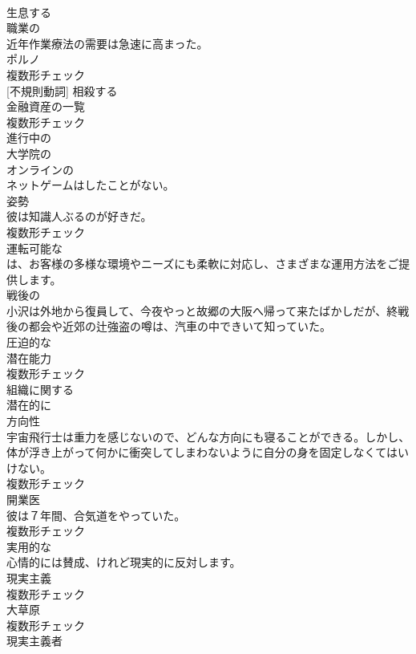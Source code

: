 \documentclass[8pt]{extreport}
\begin{document}
\begin{CJK}{UTF8}{min}
\\	[動詞]	生息する	
\\	[形容詞]	職業の	
\\	近年作業療法の需要は急速に高まった。	
\\	[名詞]	ポルノ	
\\	複数形チェック
\\	[動詞] [不規則動詞]	相殺する	
\\	[名詞]	金融資産の一覧	
\\	複数形チェック
\\	[形容詞]	進行中の	
\\	[形容詞]	大学院の	
\\	[形容詞]	オンラインの	
\\	ネットゲームはしたことがない。	
\\	[名詞]	姿勢	
\\	彼は知識人ぶるのが好きだ。	
\\	複数形チェック
\\	[形容詞]	運転可能な	
\\	は、お客様の多様な環境やニーズにも柔軟に対応し、さまざまな運用方法をご提供します。	
\\	[形容詞]	戦後の	
\\	小沢は外地から復員して、今夜やっと故郷の大阪へ帰って来たばかしだが、終戦後の都会や近郊の辻強盗の噂は、汽車の中できいて知っていた。	
\\	[形容詞]	圧迫的な	
\\	[名詞]	潜在能力	
\\	複数形チェック
\\	[形容詞]	組織に関する	
\\	[副詞]	潜在的に	
\\	[名詞]	方向性	
\\	宇宙飛行士は重力を感じないので、どんな方向にも寝ることができる。しかし、体が浮き上がって何かに衝突してしまわないように自分の身を固定しなくてはいけない。	
\\	複数形チェック
\\	[名詞]	開業医	
\\	彼は７年間、合気道をやっていた。	
\\	複数形チェック
\\	[形容詞]	実用的な	
\\	心情的には賛成、けれど現実的に反対します。	
\\	[名詞]	現実主義	
\\	複数形チェック
\\	[名詞]	大草原	
\\	複数形チェック
\\	[名詞]	現実主義者	

\end{CJK}
\end{document}
